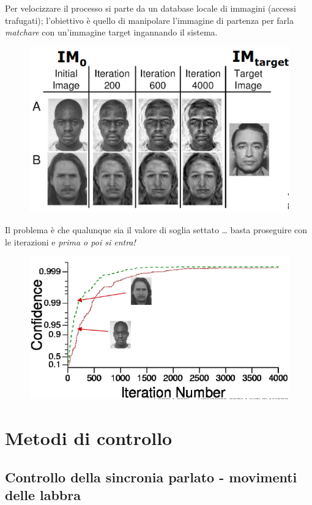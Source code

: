 \documentclass{report}
\begin{document}
\noindent Per velocizzare il processo si parte da un database locale di 
immagini (accessi trafugati); l'obiettivo è quello di manipolare l'immagine 
di partenza per farla \textit{matchare} con un'immagine target ingannando il sistema.

\begin{figure}[H]
    \centering
    \includegraphics[width=0.8\linewidth]{images/hill-climbing.png}
\end{figure}

\noindent Il problema è che qualunque sia il valore di soglia settato \dots
basta proseguire con le iterazioni e \textit{prima o poi si entra!}

\begin{figure}[H]
    \centering
    \includegraphics[width=0.8\linewidth]{images/confidence.png}
\end{figure}

\newpage
\section{Metodi di controllo}

\subsection{Controllo della sincronia parlato - movimenti delle labbra}
\end{document}
